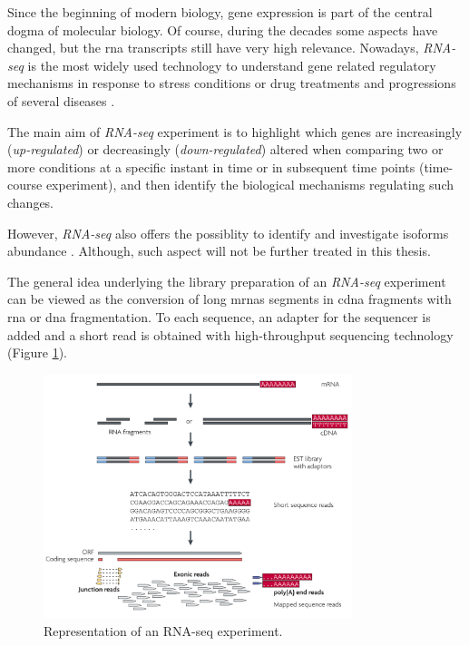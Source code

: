 Since the beginning of modern biology, gene expression is part of the central dogma of molecular biology.
Of course, during the decades some aspects have changed, but the \gls{rna} transcripts still have very high relevance.
Nowadays, \textit{RNA-seq} \cite{Thermes2014, Wang2009, Costa2010, Ozsolak2011} is the most widely used technology to understand gene related regulatory mechanisms in response to stress conditions or drug treatments and progressions of several diseases \cite{Costa2013}.

The main aim of \textit{RNA-seq} experiment is to highlight which genes are increasingly (\textit{up-regulated}) or decreasingly (\textit{down-regulated}) altered when comparing two or more conditions at a specific instant in time or in subsequent time points (time-course experiment), and then identify the biological mechanisms regulating such changes.

However, \textit{RNA-seq} also offers the possiblity to identify and investigate isoforms abundance \cite{Trapnell2010, Roberts2011, Roberts2011a, Trapnell2013}.
Although, such aspect will not be further treated in this thesis.

The general idea underlying the library preparation of an \textit{RNA-seq} experiment can be viewed as the conversion of long \glspl{mrna} segments in \gls{cdna} fragments with \gls{rna} or \gls{dna} fragmentation. 
To each sequence, an adapter for the sequencer is added and a short read is obtained with high-throughput sequencing technology (Figure \ref{fig:rnaseqexp}).

\begin{figure}[H]
\centering
\includegraphics[width=9cm, keepaspectratio]{img/intro/rna-seq.png}
\caption[RNA-seq experiment]{Representation of an RNA-seq experiment. \cite{Wang2009}}
\label{fig:rnaseqexp}

\end{figure}

